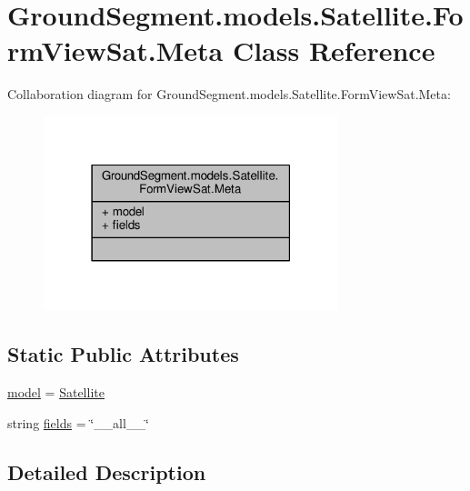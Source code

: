 \hypertarget{class_ground_segment_1_1models_1_1_satellite_1_1_form_view_sat_1_1_meta}{}\section{Ground\+Segment.\+models.\+Satellite.\+Form\+View\+Sat.\+Meta Class Reference}
\label{class_ground_segment_1_1models_1_1_satellite_1_1_form_view_sat_1_1_meta}


Collaboration diagram for Ground\+Segment.\+models.\+Satellite.\+Form\+View\+Sat.\+Meta\+:\nopagebreak
\begin{figure}[H]
\begin{center}
\leavevmode
\includegraphics[width=243pt]{class_ground_segment_1_1models_1_1_satellite_1_1_form_view_sat_1_1_meta__coll__graph}
\end{center}
\end{figure}
\subsection*{Static Public Attributes}
\begin{DoxyCompactItemize}
\item 
\hyperlink{class_ground_segment_1_1models_1_1_satellite_1_1_form_view_sat_1_1_meta_a40e3d789c88f51ff205f44aaf6c06a30}{model} = \hyperlink{class_ground_segment_1_1models_1_1_satellite_1_1_satellite}{Satellite}
\item 
string \hyperlink{class_ground_segment_1_1models_1_1_satellite_1_1_form_view_sat_1_1_meta_adba49f140eb2ffd6de1eff582d9d7d46}{fields} = \char`\"{}\+\_\+\+\_\+all\+\_\+\+\_\+\char`\"{}
\end{DoxyCompactItemize}


\subsection{Detailed Description}


